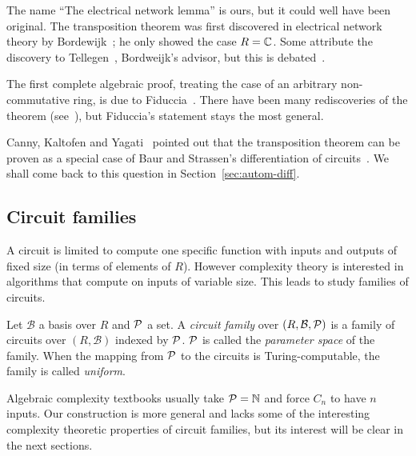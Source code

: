 \begin{nota}
  The name ``The electrical network lemma'' is ours, but it could well
  have been original. The transposition theorem was first discovered
  in electrical network theory by Bordewijk~\cite{bordewijk57}; he
  only showed the case $R=\mathbb{C}$. Some attribute the discovery to
  Tellegen~\cite{burgisser+clausen-shokrollahi,bostan+lecerf+schost:tellegen},
  Bordweijk's advisor, but this is debated~\cite{djb:tellegen}.

  The first complete algebraic proof, treating the case of an
  arbitrary non-commutative ring, is due to
  Fiduccia~\cite{fiduccia:phd}. There have been many rediscoveries of
  the theorem (see~\cite{djb:tellegen}), but Fiduccia's statement stays
  the most general.

  Canny, Kaltofen and Yagati~\cite{canny+kaltofen+yagati89,Ka2K}
  pointed out that the transposition theorem can be proven as a
  special case of Baur and Strassen's differentiation of
  circuits~\cite{baur+strassen83}. We shall come back to this question
  in Section~\ref{sec:autom-diff}.
\end{nota}


\subsection{Circuit families}
\label{sec:uniformity}

A circuit is limited to compute one specific function with inputs and
outputs of fixed size (in terms of elements of $R$). However complexity
theory is interested in algorithms that compute on inputs of variable
size. This leads to study families of circuits.

\begin{definition}
  Let $\mathcal{B}$ a basis over $R$ and $\mathcal{P}$ a set. A
  \emph{circuit family} over
  $(R,\mathcal{B},\mathcal{P})$ is a family of circuits over
  $(R,\mathcal{B})$ indexed by $\mathcal{P}$.  $\mathcal{P}$ is called the
  \emph{parameter space} of the family. When the mapping from
  $\mathcal{P}$ to the circuits is Turing-computable, the family is called
  \emph{uniform}.
\end{definition}

Algebraic complexity textbooks usually take $\mathcal{P}=\mathbb{N}$ and force
$C_n$ to have $n$ inputs. Our construction is more general and lacks
some of the interesting complexity theoretic properties of circuit
families, but its interest will be clear in the next sections.

